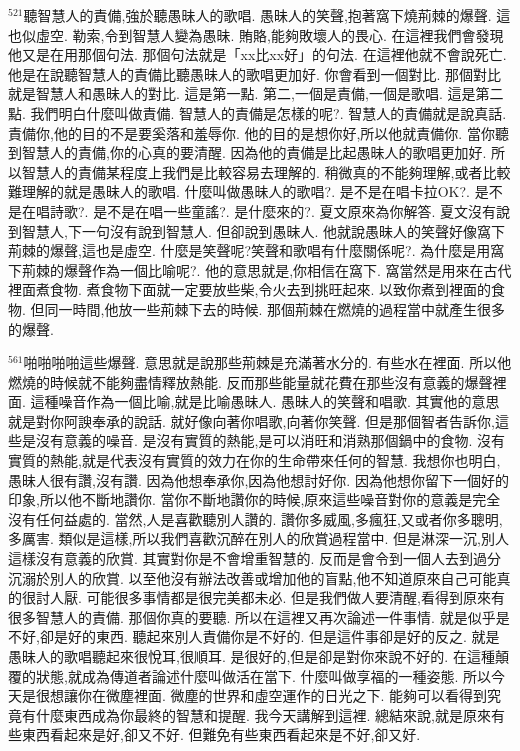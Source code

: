 \documentclass{book}
\begin{document}
$^{521}$聽智慧人的責備,強於聽愚昧人的歌唱.
愚昧人的笑聲,抱著窩下燒荊棘的爆聲.
這也似虛空.
勒索,令到智慧人變為愚昧.
賄賂,能夠敗壞人的畏心.
在這裡我們會發現他又是在用那個句法.
那個句法就是「xx比xx好」的句法.
在這裡他就不會說死亡.
他是在說聽智慧人的責備比聽愚昧人的歌唱更加好.
你會看到一個對比.
那個對比就是智慧人和愚昧人的對比.
這是第一點.
第二,一個是責備,一個是歌唱.
這是第二點.
我們明白什麼叫做責備.
智慧人的責備是怎樣的呢?.
智慧人的責備就是說真話.
責備你,他的目的不是要奚落和羞辱你.
他的目的是想你好,所以他就責備你.
當你聽到智慧人的責備,你的心真的要清醒.
因為他的責備是比起愚昧人的歌唱更加好.
所以智慧人的責備某程度上我們是比較容易去理解的.
稍微真的不能夠理解,或者比較難理解的就是愚昧人的歌唱.
什麼叫做愚昧人的歌唱?.
是不是在唱卡拉OK?.
是不是在唱詩歌?.
是不是在唱一些童謠?.
是什麼來的?.
夏文原來為你解答.
夏文沒有說到智慧人,下一句沒有說到智慧人.
但卻說到愚昧人.
他就說愚昧人的笑聲好像窩下荊棘的爆聲,這也是虛空.
什麼是笑聲呢?笑聲和歌唱有什麼關係呢?.
為什麼是用窩下荊棘的爆聲作為一個比喻呢?.
他的意思就是,你相信在窩下.
窩當然是用來在古代裡面煮食物.
煮食物下面就一定要放些柴,令火去到挑旺起來.
以致你煮到裡面的食物.
但同一時間,他放一些荊棘下去的時候.
那個荊棘在燃燒的過程當中就產生很多的爆聲.

$^{561}$啪啪啪啪這些爆聲.
意思就是說那些荊棘是充滿著水分的.
有些水在裡面.
所以他燃燒的時候就不能夠盡情釋放熱能.
反而那些能量就花費在那些沒有意義的爆聲裡面.
這種噪音作為一個比喻,就是比喻愚昧人.
愚昧人的笑聲和唱歌.
其實他的意思就是對你阿諛奉承的說話.
就好像向著你唱歌,向著你笑聲.
但是那個智者告訴你,這些是沒有意義的噪音.
是沒有實質的熱能,是可以消旺和消熟那個鍋中的食物.
沒有實質的熱能,就是代表沒有實質的效力在你的生命帶來任何的智慧.
我想你也明白,愚昧人很有讚,沒有讚.
因為他想奉承你,因為他想討好你.
因為他想你留下一個好的印象,所以他不斷地讚你.
當你不斷地讚你的時候,原來這些噪音對你的意義是完全沒有任何益處的.
當然,人是喜歡聽別人讚的.
讚你多威風,多瘋狂,又或者你多聰明,多厲害.
類似是這樣,所以我們喜歡沉醉在別人的欣賞過程當中.
但是淋深一沉,別人這樣沒有意義的欣賞.
其實對你是不會增重智慧的.
反而是會令到一個人去到過分沉溺於別人的欣賞.
以至他沒有辦法改善或增加他的盲點,他不知道原來自己可能真的很討人厭.
可能很多事情都是很完美都未必.
但是我們做人要清醒,看得到原來有很多智慧人的責備.
那個你真的要聽.
所以在這裡又再次論述一件事情.
就是似乎是不好,卻是好的東西.
聽起來別人責備你是不好的.
但是這件事卻是好的反之.
就是愚昧人的歌唱聽起來很悅耳,很順耳.
是很好的,但是卻是對你來說不好的.
在這種顛覆的狀態,就成為傳道者論述什麼叫做活在當下.
什麼叫做享福的一種姿態.
所以今天是很想讓你在微塵裡面.
微塵的世界和虛空運作的日光之下.
能夠可以看得到究竟有什麼東西成為你最終的智慧和提醒.
我今天講解到這裡.
總結來說,就是原來有些東西看起來是好,卻又不好.
但難免有些東西看起來是不好,卻又好.
\end{document}
